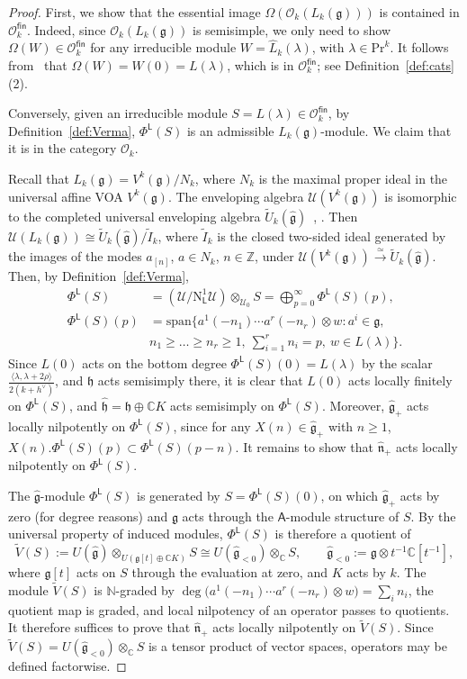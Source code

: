 \documentclass[12pt,a4paper,reqno]{amsart}
\numberwithin{equation}{section}
\theoremstyle{definition}
\newcommand{\g}{\mathfrak{g}}
\newcommand{\C}{\mathbb{C}}
\newcommand{\N}{\mathbb{N}}
\newcommand{\Z}{\mathbb{Z}}
\def\O{\mathcal{O}}
\def\fin{\mathsf{fin}}
\def\L{\mathsf{L}}
\def\Om{\Omega}
\def\Pr{\mathrm{Pr}}
\def\la{\lambda}
\def \h{\mathfrak{h}}
\def\spn{\mathrm{span}}
\def\o{\otimes}
\def\op{\oplus}
\def\n{\mathfrak{n}}
\def\scrU{\mathscr{U}}
\def\<{\langle}
\def\>{\rangle}
\def\rN{\mathrm{N}}
\def\A{\mathsf{A}}
\begin{document}
\begin{proof}
First, we show that the essential image $\Om(\O_k(L_k(\g)))$ is contained in $\O_k^\fin$. Indeed, since $\O_k(L_k(\g))$ is semisimple, we only need to show $\Om(W)\in \O_k^\fin$ for any irreducible module $W=\hat{L}_k(\la)$, with $\la\in \Pr^k$. It follows from~\cite[Proposition 5.4]{DLM} that $\Om(W)=W(0)=L(\la)$, which is in $\O_k^\fin$; see Definition~\ref{def:cats}(2).

Conversely, given an irreducible module $S=L(\la)\in \O_k^\fin$, by Definition~\ref{def:Verma}, $\Phi^\L(S)$ is an admissible $L_k(\g)$-module. We claim that it is in the category $\O_k$.

Recall that $L_k(\g)=V^k(\g)/N_k$, where $N_k$ is the maximal proper ideal in the universal affine VOA $V^k(\g)$. 
The enveloping algebra $\scrU(V^k(\g))$ is isomorphic to the completed universal enveloping algebra $\tilde{U}_k(\hat{\g})$~\cite[Section 3.1]{FZ92}, \cite[Section 4.4.3]{frenkel_ben_zvi_book}. Then
 $\scrU(L_k(\g))\cong \tilde{U}_k(\hat{\g})/\tilde{I}_k$, where $\tilde{I}_k$ is the closed two-sided ideal generated by the images of the modes $a_{[n]}$, $a\in N_k$, $n\in\Z$, under $\scrU(V^k(\g))\xrightarrow{\simeq} \tilde{U}_k(\hat{\g})$.
 Then, by Definition~\ref{def:Verma},
\begin{align*}
 \Phi^\L(S)&=(\scrU/\rN^1_\L\scrU)\o_{\scrU_0} S= \bigoplus_{p=0}^\infty \Phi^\L(S)(p),\\
\Phi^\L(S)(p)&=\spn\{a^1(-n_1)\cdots a^r(-n_r)\o w:a^i\in \g,\ \\ & n_1\geq \dots\geq n_r\geq 1,\ \sum_{i=1}^r n_i=p, \ w\in L(\la)\}.
\end{align*}
Since $L(0)$ acts on the bottom degree $\Phi^\L(S)(0)=L(\la)$ by the scalar $\frac{\<\la,\la+2\rho\>}{2(k+h^\vee)}$, and $\h$ acts semisimply there, it is clear that $L(0)$ acts locally finitely on $\Phi^\L(S)$, and $\hat{\h}=\h\op \C K$ acts semisimply on $\Phi^\L(S)$. Moreover, $\hat{\g}_+$ acts locally nilpotently on $\Phi^\L(S)$, since for any $X(n)\in \hat{\g}_+$ with $n\geq 1$, $X(n).\Phi^\L(S)(p)\subset \Phi^\L(S)(p-n)$. It remains to show that $\hat{\n}_+$ acts locally nilpotently on $\Phi^\L(S)$.

The $\hat{\g}$-module $\Phi^\L(S)$ is generated by $S=\Phi^\L(S)(0)$, on which $\hat{\g}_+$ acts by zero (for degree reasons) and $\g$ acts through the $\A$-module structure of $S$. By the universal property of induced modules, $\Phi^\L(S)$ is therefore a quotient of
\[
\widetilde{V}(S):=U(\hat{\g})\o_{U(\g[t]\op\C K)} S\cong U(\hat{\g}_{<0})\o_\C S,\qquad \hat{\g}_{<0}:=\g\o t^{-1}\C[t^{-1}],
\]
where $\g[t]$ acts on $S$ through the evaluation at zero, and $K$ acts by $k$. The module $\widetilde{V}(S)$ is $\N$-graded by $\deg\big(a^1(-n_1)\cdots a^r(-n_r)\o w\big)=\sum_i n_i$, the quotient map is graded, and local nilpotency of an operator passes to quotients. It therefore suffices to prove that $\hat{\n}_+$ acts locally nilpotently on $\widetilde{V}(S)$. Since $\widetilde{V}(S)=U(\hat{\g}_{<0})\o_\C S$ is a tensor product of vector spaces, operators may be defined factorwise.


\end{proof}
\end{document}
